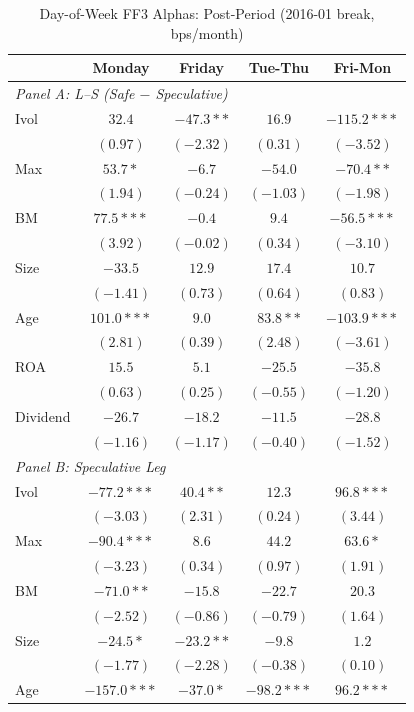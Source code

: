 \begin{table}[htbp]
\centering
\caption{Day-of-Week FF3 Alphas: Post-Period (2016-01 break, bps/month)}
\label{tab:split_ff3_201601_post_ff3}
\footnotesize
\begin{tabular}{l c c c c}
\toprule
 & Monday & Friday & Tue-Thu & Fri-Mon \\
\midrule
\multicolumn{5}{l}{\textit{Panel A: L--S (Safe $-$ Speculative)}} \\
Ivol & $32.4$ & $-47.3**$ & $16.9$ & $-115.2***$ \\
 & $(0.97)$ & $(-2.32)$ & $(0.31)$ & $(-3.52)$ \\
Max & $53.7*$ & $-6.7$ & $-54.0$ & $-70.4**$ \\
 & $(1.94)$ & $(-0.24)$ & $(-1.03)$ & $(-1.98)$ \\
BM & $77.5***$ & $-0.4$ & $9.4$ & $-56.5***$ \\
 & $(3.92)$ & $(-0.02)$ & $(0.34)$ & $(-3.10)$ \\
Size & $-33.5$ & $12.9$ & $17.4$ & $10.7$ \\
 & $(-1.41)$ & $(0.73)$ & $(0.64)$ & $(0.83)$ \\
Age & $101.0***$ & $9.0$ & $83.8**$ & $-103.9***$ \\
 & $(2.81)$ & $(0.39)$ & $(2.48)$ & $(-3.61)$ \\
ROA & $15.5$ & $5.1$ & $-25.5$ & $-35.8$ \\
 & $(0.63)$ & $(0.25)$ & $(-0.55)$ & $(-1.20)$ \\
Dividend & $-26.7$ & $-18.2$ & $-11.5$ & $-28.8$ \\
 & $(-1.16)$ & $(-1.17)$ & $(-0.40)$ & $(-1.52)$ \\
\midrule
\multicolumn{5}{l}{\textit{Panel B: Speculative Leg}} \\
Ivol & $-77.2***$ & $40.4**$ & $12.3$ & $96.8***$ \\
 & $(-3.03)$ & $(2.31)$ & $(0.24)$ & $(3.44)$ \\
Max & $-90.4***$ & $8.6$ & $44.2$ & $63.6*$ \\
 & $(-3.23)$ & $(0.34)$ & $(0.97)$ & $(1.91)$ \\
BM & $-71.0**$ & $-15.8$ & $-22.7$ & $20.3$ \\
 & $(-2.52)$ & $(-0.86)$ & $(-0.79)$ & $(1.64)$ \\
Size & $-24.5*$ & $-23.2**$ & $-9.8$ & $1.2$ \\
 & $(-1.77)$ & $(-2.28)$ & $(-0.38)$ & $(0.10)$ \\
Age & $-157.0***$ & $-37.0*$ & $-98.2***$ & $96.2***$ \\

\end{tabular}
\end{table}
